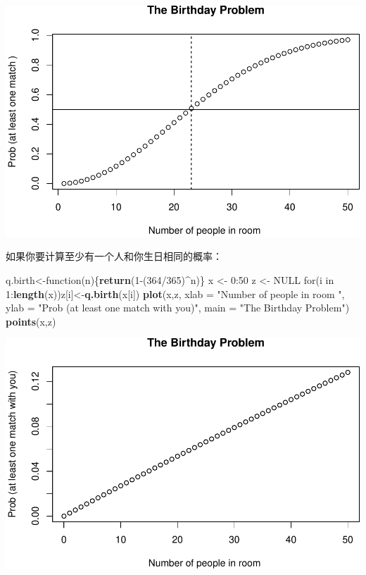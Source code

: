 \documentclass[]{article}
\newenvironment{Shaded}{\begin{snugshade}}{\end{snugshade}}
\newcommand{\KeywordTok}[1]{\textcolor[rgb]{0.13,0.29,0.53}{\textbf{{#1}}}}
\newcommand{\DataTypeTok}[1]{\textcolor[rgb]{0.13,0.29,0.53}{{#1}}}
\newcommand{\DecValTok}[1]{\textcolor[rgb]{0.00,0.00,0.81}{{#1}}}
\newcommand{\StringTok}[1]{\textcolor[rgb]{0.31,0.60,0.02}{{#1}}}
\newcommand{\OtherTok}[1]{\textcolor[rgb]{0.56,0.35,0.01}{{#1}}}
\newcommand{\NormalTok}[1]{{#1}}
\begin{document}
\includegraphics{probability_files/figure-latex/unnamed-chunk-7-1.pdf}

如果你要计算至少有一个人和你生日相同的概率：

\begin{Shaded}
\begin{Highlighting}[]
\NormalTok{q.birth<-function(n)\{}\KeywordTok{return}\NormalTok{(}\DecValTok{1}\NormalTok{-(}\DecValTok{364}\NormalTok{/}\DecValTok{365}\NormalTok{)^n)\}}
\NormalTok{x <-}\StringTok{ }\DecValTok{0}\NormalTok{:}\DecValTok{50}
\NormalTok{z <-}\StringTok{ }\OtherTok{NULL}
\NormalTok{for(i in }\DecValTok{1}\NormalTok{:}\KeywordTok{length}\NormalTok{(x))z[i]<-}\KeywordTok{q.birth}\NormalTok{(x[i])}
\KeywordTok{plot}\NormalTok{(x,z,}
     \DataTypeTok{xlab =} \StringTok{"Number of people in room "}\NormalTok{,}
     \DataTypeTok{ylab =} \StringTok{"Prob (at least one match with you)"}\NormalTok{,}
     \DataTypeTok{main =} \StringTok{"The Birthday Problem"}\NormalTok{)}
\KeywordTok{points}\NormalTok{(x,z)}
\end{Highlighting}
\end{Shaded}

\includegraphics{probability_files/figure-latex/unnamed-chunk-8-1.pdf}
\end{document}
